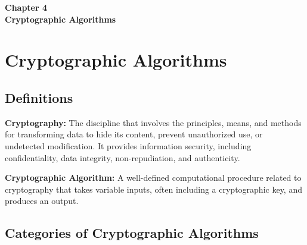 \clearpage
\thispagestyle{empty} 
\begin{center}
    \vspace*{\fill} 
    \Huge \textbf{Chapter 4} \\
    \Huge \textbf{Cryptographic Algorithms} 
    \vspace*{\fill}
\end{center}
\clearpage

\chapter{Cryptographic Algorithms}

\section{Definitions}

\textbf{Cryptography:} The discipline that involves the principles, means, and methods for transforming data to hide its content, prevent unauthorized use, or undetected modification. It provides information security, including confidentiality, data integrity, non-repudiation, and authenticity.

\textbf{Cryptographic Algorithm:} A well-defined computational procedure related to cryptography that takes variable inputs, often including a cryptographic key, and produces an output.

\section{Categories of Cryptographic Algorithms}

\begin{table}[h]
\centering
{}
\caption{Categories of Cryptographic Algorithms}
\end{table}

